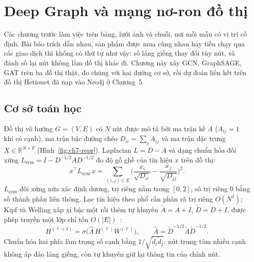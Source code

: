 \chapter{Deep Graph và mạng nơ-ron đồ thị}\label{chap:gnn}

Các chương trước làm việc trên bảng, lưới ảnh và chuỗi, nơi mỗi mẫu có vị trí cố định. Bài báo trích dẫn nhau, sản phẩm được
mua cùng nhau hay tiền chạy qua các giao dịch thì không có thứ tự như vậy: số láng giềng thay đổi tùy nút, và đánh số lại nút
không làm đồ thị khác đi. Chương này xây GCN, GraphSAGE, GAT trên ba đồ thị thật, đo chúng với hai đường cơ sở, rồi dự đoán
liên kết trên đồ thị Hetionet đã nạp vào Neo4j ở Chương~5.

\section{Cơ sở toán học}

Đồ thị vô hướng $G=(V,E)$ có $N$ nút được mô tả bởi ma trận kề $A$ ($A_{ij}=1$ khi có cạnh), ma trận bậc đường chéo
$D_{ii}=\sum_j A_{ij}$ và ma trận đặc trưng $X\in\mathbb R^{N\times F}$ (Hình~\ref{fig:ch7-repr}). Laplacian $L=D-A$ và dạng
chuẩn hóa đối xứng $L_{\mathrm{sym}}=I-D^{-1/2}AD^{-1/2}$ đo độ gồ ghề của tín hiệu $x$ trên đồ thị:
\begin{equation}
x^{\top}L_{\mathrm{sym}}\,x=\sum_{(i,j)\in E}\Big(\frac{x_i}{\sqrt{D_{ii}}}-\frac{x_j}{\sqrt{D_{jj}}}\Big)^2 .
\end{equation}
$L_{\mathrm{sym}}$ đối xứng nửa xác định dương, trị riêng nằm trong $[0,2]$, số trị riêng 0 bằng số thành phần liên thông.
Lọc tín hiệu theo phổ cần phân rã trị riêng $O(N^3)$; Kipf và Welling xấp xỉ bậc một rồi thêm tự khuyên
$\tilde A=A+I$, $\tilde D=D+I$, được phép truyền một lớp chỉ tốn $O(|E|)$~\cite{ch7:kipf2017}:
\begin{equation}
H^{(\ell+1)}=\sigma\big(\hat A\,H^{(\ell)}W^{(\ell)}\big),\qquad \hat A=\tilde D^{-1/2}\tilde A\tilde D^{-1/2}.
\end{equation}
Chuẩn hóa hai phía làm trọng số cạnh bằng $1/\sqrt{\tilde d_i\tilde d_j}$: nút trung tâm nhiều cạnh không áp đảo láng giềng,
còn tự khuyên giữ lại thông tin của chính nút.


